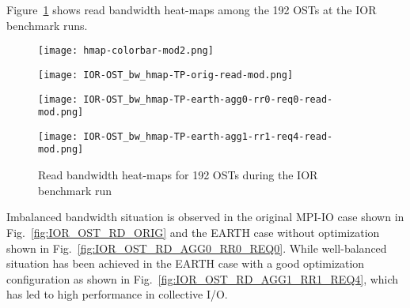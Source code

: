 \documentclass{jhps}
\begin{document}
Figure~\ref{fig:IOR_OST_BW_HMAP_RD} shows read bandwidth heat-maps
among the 192 OSTs at the IOR benchmark runs.
%
\begin{figure}[htb]
\begin{minipage}[t]{0.06\textwidth}
 \texttt{[image: hmap-colorbar-mod2.png]}
\end{minipage}
%
\noindent
\begin{minipage}[t]{0.3\textwidth}
 \centering
 \texttt{[image: IOR-OST\_bw\_hmap-TP-orig-read-mod.png]}
 \label{fig:IOR_OST_RD_ORIG}
\end{minipage}
%
\noindent
\begin{minipage}[t]{0.3\textwidth}
 \centering
 \texttt{[image: IOR-OST\_bw\_hmap-TP-earth-agg0-rr0-req0-read-mod.png]}
 \label{fig:IOR_OST_RD_AGG0_RR0_REQ0}
\end{minipage}
%
\noindent
\begin{minipage}[t]{0.3\textwidth}
 \centering
 \texttt{[image: IOR-OST\_bw\_hmap-TP-earth-agg1-rr1-req4-read-mod.png]}
 \label{fig:IOR_OST_RD_AGG1_RR1_REQ4}
\end{minipage}
%
\caption{Read bandwidth heat-maps for 192 OSTs during the IOR benchmark run}
\label{fig:IOR_OST_BW_HMAP_RD}
\end{figure}
%
Imbalanced bandwidth situation is observed in the original MPI-IO case shown in
Fig.~\ref{fig:IOR_OST_RD_ORIG}
and the EARTH case without optimization shown
in Fig.~\ref{fig:IOR_OST_RD_AGG0_RR0_REQ0}.
While well-balanced situation has been achieved in the EARTH case
with a good optimization configuration as shown in
Fig.~\ref{fig:IOR_OST_RD_AGG1_RR1_REQ4},
which has led to high performance in collective I/O.
\end{document}
